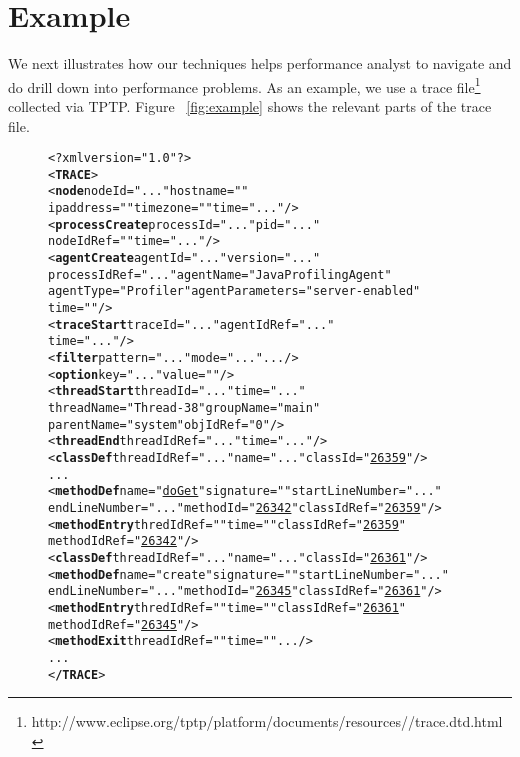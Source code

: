 \section{Example}
\label{sec:example}
%

We next illustrates how our techniques helps performance analyst to navigate and do drill down into performance problems. As an example, we use a trace file\footnote{http://www.eclipse.org/tptp/platform/documents/resources/\profilingspec/trace.dtd.html} collected via TPTP. 
Figure ~\ref{fig:example} shows the relevant parts of the trace file.

\begin{figure}[t]
\begin{CodeOut}
\begin{alltt}
<?xml version="1.0"?>
<\textbf{TRACE}>
<\textbf{node} nodeId="..." hostname="" 
 ipaddress="" timezone="" time="..."/>
<\textbf{processCreate} processId="..." pid="..." 
 nodeIdRef="" time="..."/>
<\textbf{agentCreate} agentId="..." version="..." 
 processIdRef="..." agentName="Java Profiling Agent" 
 agentType="Profiler" agentParameters="server-enabled" 
 time=""/>
<\textbf{traceStart} traceId="..." agentIdRef="..." 
 time="..."/>
<\textbf{filter} pattern="..." mode="..." .../>
<\textbf{option} key="..." value=""/>
<\textbf{threadStart} threadId="..." time="..." 
 threadName="Thread-38" groupName="main" 
 parentName="system" objIdRef="0"/>
<\textbf{threadEnd} threadIdRef="..." time="..." />
<\textbf{classDef} threadIdRef="..." name="..." classId="\underline{26359}"/>
...
<\textbf{methodDef} name="\underline{doGet}" signature="" startLineNumber="..." 
 endLineNumber="..." methodId="\underline{26342}" classIdRef="\underline{26359}"/>
<\textbf{methodEntry} thredIdRef="" time="" classIdRef="\underline{26359}"
 methodIdRef="\underline{26342}"/>
<\textbf{classDef} threadIdRef="..." name="..." classId="\underline{26361}"/>
<\textbf{methodDef} name="create" signature="" startLineNumber="..." 
 endLineNumber="..." methodId="\underline{26345}" classIdRef="\underline{26361}"/>
<\textbf{methodEntry} thredIdRef="" time="" classIdRef="\underline{26361}"
 methodIdRef="\underline{26345}"/>
<\textbf{methodExit} threadIdRef="" time="".../>
...
<\textbf{/TRACE}>
\end{alltt}
\end{CodeOut}\vspace*{-2ex}
\vspace*{-3ex}
\end{figure}

